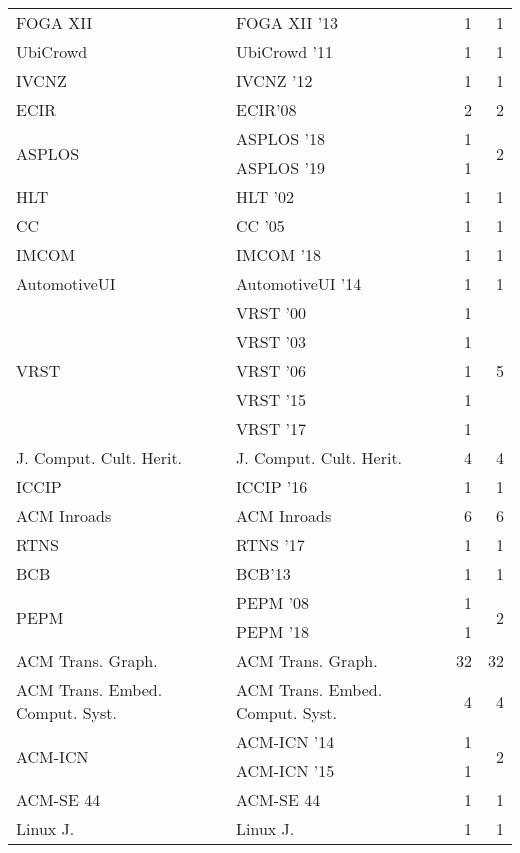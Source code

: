 \begin{table*}[t]
\begin{tabular}{llrr}
\multirow{1}{*}{FOGA XII } & FOGA XII '13 & 1 & \multirow{1}{*}{1}\\
\multirow{1}{*}{UbiCrowd } & UbiCrowd '11 & 1 & \multirow{1}{*}{1}\\
\multirow{1}{*}{IVCNZ } & IVCNZ '12 & 1 & \multirow{1}{*}{1}\\
\multirow{1}{*}{ECIR} & ECIR'08 & 2 & \multirow{1}{*}{2}\\
\multirow{2}{*}{ASPLOS } & ASPLOS '18 & 1 & \multirow{2}{*}{2}\\
& ASPLOS '19 & 1 &\\
\multirow{1}{*}{HLT } & HLT '02 & 1 & \multirow{1}{*}{1}\\
\multirow{1}{*}{CC } & CC '05 & 1 & \multirow{1}{*}{1}\\
\multirow{1}{*}{IMCOM } & IMCOM '18 & 1 & \multirow{1}{*}{1}\\
\multirow{1}{*}{AutomotiveUI } & AutomotiveUI '14 & 1 & \multirow{1}{*}{1}\\
\multirow{5}{*}{VRST } & VRST '00 & 1 & \multirow{5}{*}{5}\\
& VRST '03 & 1 &\\
& VRST '06 & 1 &\\
& VRST '15 & 1 &\\
& VRST '17 & 1 &\\
\multirow{1}{*}{J. Comput. Cult. Herit.} & J. Comput. Cult. Herit. & 4 & \multirow{1}{*}{4}\\
\multirow{1}{*}{ICCIP } & ICCIP '16 & 1 & \multirow{1}{*}{1}\\
\multirow{1}{*}{ACM Inroads} & ACM Inroads & 6 & \multirow{1}{*}{6}\\
\multirow{1}{*}{RTNS } & RTNS '17 & 1 & \multirow{1}{*}{1}\\
\multirow{1}{*}{BCB} & BCB'13 & 1 & \multirow{1}{*}{1}\\
\multirow{2}{*}{PEPM } & PEPM '08 & 1 & \multirow{2}{*}{2}\\
& PEPM '18 & 1 &\\
\multirow{1}{*}{ACM Trans. Graph.} & ACM Trans. Graph. & 32 & \multirow{1}{*}{32}\\
\multirow{1}{*}{ACM Trans. Embed. Comput. Syst.} & ACM Trans. Embed. Comput. Syst. & 4 & \multirow{1}{*}{4}\\
\multirow{2}{*}{ACM-ICN } & ACM-ICN '14 & 1 & \multirow{2}{*}{2}\\
& ACM-ICN '15 & 1 &\\
\multirow{1}{*}{ACM-SE 44} & ACM-SE 44 & 1 & \multirow{1}{*}{1}\\
\multirow{1}{*}{Linux J.} & Linux J. & 1 & \multirow{1}{*}{1}\\

\end{tabular}
\end{table*}
